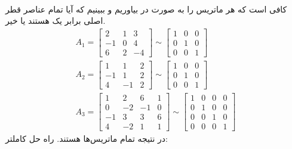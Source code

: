 \\
کافی است که هر ماتریس را به صورت
در بیاوریم و ببینیم که آیا تمام عناصر قطر اصلی برابر یک هستند یا خیر.
\begin{gather*}
    A_1 = \begin{bmatrix}
        2 & 1 & 3\\
        -1 & 0 & 4\\
        6 & 2 & -4
    \end{bmatrix}
    \sim
    \begin{bmatrix}
        1 & 0 & 0\\
        0 & 1 & 0\\
        0 & 0 & 1
    \end{bmatrix}
    \\
    A_2 = \begin{bmatrix}
        1 & 1 & 2\\
        -1 & 1 & 2\\
        4 & -1 & 2
    \end{bmatrix}
    \sim
    \begin{bmatrix}
        1 & 0 & 0\\
        0 & 1 & 0\\
        0 & 0 & 1
    \end{bmatrix}
    \\
    A_3 = \begin{bmatrix}
        1 & 2 & 6 & 1\\
        0 & -2 & -1 & 0\\
        -1 & 3 & 3 & 6\\
        4 & -2 & 1 & 1
    \end{bmatrix}
    \sim
    \begin{bmatrix}
        1 & 0 & 0 & 0\\
        0 & 1 & 0 & 0\\
        0 & 0 & 1 & 0\\
        0 & 0 & 0 & 1
    \end{bmatrix}
\end{gather*}
در نتیجه تمام ماتریس‌ها
هستند.
راه حل کاملتر:
